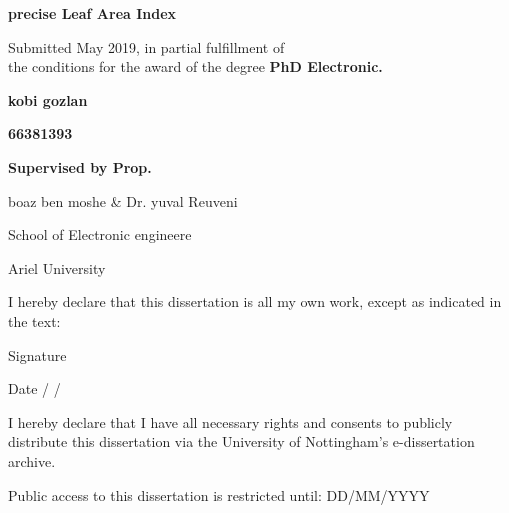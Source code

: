 

 \par

\vskip 1in \par 
\LARGE {\bf precise Leaf Area Index }

\vskip 0.5in \par
\normalsize {Submitted May 2019, in partial fulfillment of \\ the conditions for the award of the degree \bf{PhD Electronic}.}

\vskip 0.3in \par
\large {\bf kobi gozlan}\par
\large {\bf 66381393}

\vskip 0.3in \par
\large {\bf Supervised by Prop. \par boaz ben moshe \& Dr. yuval Reuveni}
\vskip 0.3in \par
\normalsize { School of Electronic engineere  \par Ariel University}

\vskip 0.5in \par
\normalsize {I hereby declare that this dissertation is all my own work, except as indicated in the text: }

\vskip 0.5in 
\normalsize {Signature \underline{\hspace{1.5in}}}

\vskip 0.1in
\normalsize {Date \underline{\hspace{0.5in}} / \underline{\hspace{0.5in}} / \underline{\hspace{0.5in}}}


\vskip 0.4in \par
\normalsize {I hereby declare that I have all necessary rights and consents to publicly distribute this dissertation via the University of Nottingham's e-dissertation archive.}

\vskip 0.4in \par
\normalsize {Public access to this dissertation is restricted until: DD/MM/YYYY}


\def\titlepage{
\newpage
\centering
\linespread{1}
\normalsize
\vbox to  \vsize\bgroup\vbox to 9in\bgroup
}
\def\endtitlepage{
\par
\kern 0pt
\egroup
\vss
\egroup
\cleardoublepage
}